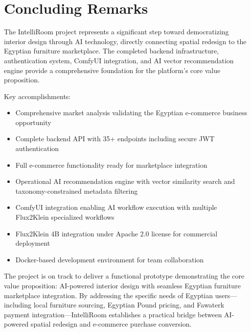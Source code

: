 \section{Concluding Remarks}
\label{sec:concluding}

The IntelliRoom project represents a significant step toward democratizing interior design through AI technology, directly connecting spatial redesign to the Egyptian furniture marketplace. The completed backend infrastructure, authentication system, ComfyUI integration, and AI vector recommendation engine provide a comprehensive foundation for the platform's core value proposition.

Key accomplishments:
\begin{itemize}
    \item Comprehensive market analysis validating the Egyptian e-commerce business opportunity
    \item Complete backend API with 35+ endpoints including secure JWT authentication
    \item Full e-commerce functionality ready for marketplace integration
    \item Operational AI recommendation engine with vector similarity search and taxonomy-constrained metadata filtering
    \item ComfyUI integration enabling AI workflow execution with multiple Flux2Klein specialized workflows
    \item Flux2Klein 4B integration under Apache 2.0 license for commercial deployment
    \item Docker-based development environment for team collaboration
\end{itemize}

The project is on track to deliver a functional prototype demonstrating the core value proposition: AI-powered interior design with seamless Egyptian furniture marketplace integration. By addressing the specific needs of Egyptian users---including local furniture sourcing, Egyptian Pound pricing, and Fawaterk payment integration---IntelliRoom establishes a practical bridge between AI-powered spatial redesign and e-commerce purchase conversion.
